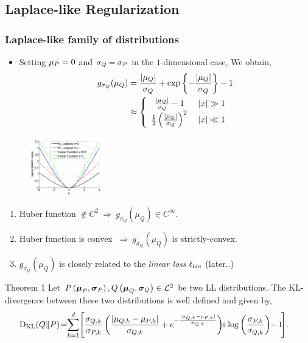 \documentclass[mathserif]{beamer}
\begin{document}
\subsection{Laplace-like Regularization}
\begin{frame}
\frametitle{ Laplace-like family of distributions }
\begin{itemize}
\item Setting $\mu_{P}=0$ and ${\sigma_{Q}}={\sigma_{P}}$ in the $1$-dimensional case, We obtain,
\begin{align*}
g_{\sigma_Q}(\mu_Q)&=  \frac{|\mu_{Q}|}{\sigma_{Q}}
+\exp{\left\{{-\frac{|\mu_{Q}|}{\sigma_{Q}} }\right\} }  -1 \\
   &\approx \left\{ \begin{array}{rl}
  { \frac{|\mu_{Q}|}{\sigma_{Q}}} -1~ &\mbox{  $\left\vert{x}\right\vert\gg 1$} \\
  \frac{1}{2}\left({\frac{|\mu_{Q}|}{\sigma_{Q}}}\right)^2 &\mbox{ $\left\vert{x}\right\vert\ll1$}
       \end{array} \right.
\end{align*}
\end{itemize}
\begin{figure}
\includegraphics[width=0.3\textwidth]{figs/kl_and_huber}
\end{figure}
\begin{enumerate}
\item  Huber function $\not\in C^2 ~\Longrightarrow ~g_{\sigma_Q}(\mu_Q) \in C^{\infty}$.
 \item Huber function is convex $~\Longrightarrow~ g_{\sigma_Q}(\mu_Q)$ is strictly-convex.
\item $g_{\sigma_Q}(\mu_Q)$ is closely related to the \textit{linear loss} $\ell_{lin}$  (later..)
\end{enumerate}
\begin{block}{Theorem 1}
Let ${P}\left({{\boldsymbol{\mu}}_P,{\boldsymbol{\sigma}}_{P}}\right),{Q}\left({{\boldsymbol{\mu}}_Q,{\boldsymbol{\sigma}}_{Q}}\right)\in{\mathcal{L}}^2$
be two LL distributions. The KL- divergence between these two distributions is well defined and given by,
\begin{align*}
\KL(\cQ \Vert \cP)  \!=&\! \sum_{k=1}^{d}\!  \Bigg[    \frac{\sigmaqi{k}}{\sigmapi{k} }\paren{ \frac{ |\muqi{k}-\mupi{k}| }{\sigmaqi{k}}+e^{{-\frac{ |\muqi{k}-\mupi{k}| }{\sigmaqi{k}} } }  }
\!\!\!+\!\log{ \paren{ \frac{\sigmapi{k}}{\sigmaqi{k}} } }\!\!-1\! \Bigg].
\end{align*}
\end{block}
\end{frame}
\end{document}

